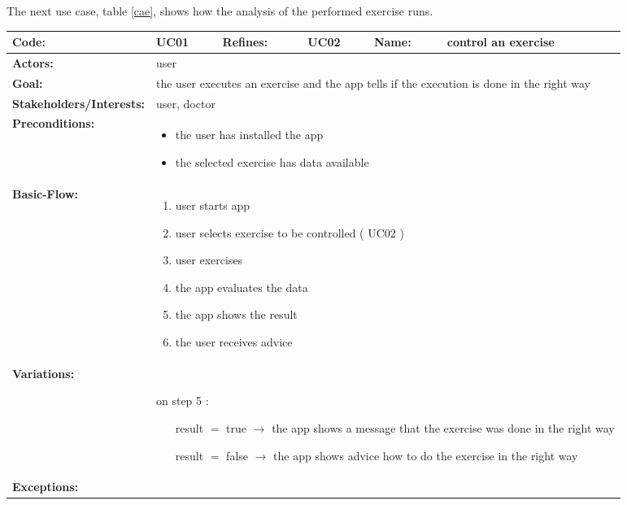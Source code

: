 \clearpage
The next use case, table \ref{cae}, shows how the analysis of the performed exercise runs.
\begin{table}[H]
	\begin{tabular}{|l|l|l|l|l|l|} \hline
		\textbf{Code:} & UC01 & \textbf{Refines:} & UC02 & \textbf{Name:} & control an exercise \\ \hline
		\textbf{Actors:} & \multicolumn{5}{l|}{user} \\ \hline
		\textbf{Goal:} & \multicolumn{5}{l|}{the user executes an exercise and the app tells if the execution is done in the right way} \\ \hline
		\textbf{Stakeholders/Interests:} & \multicolumn{5}{l|}{user, doctor} \\ \hline
		\textbf{Preconditions:} & \multicolumn{5}{l|}{\parbox{0.75\textwidth}{
			\begin{itemize}[itemsep=-5]
				\item the user has installed the app
				\item the selected exercise has data available
			\end{itemize}
		}} \\ \hline
		\textbf{Basic-Flow:} & \multicolumn{5}{l|}{\parbox{0.75\textwidth}{
			\begin{enumerate}[itemsep=-5]
				\item user starts app
				\item user selects exercise to be controlled ( UC02 )
				\item user exercises
				\item the app evaluates the data
				\item the app shows the result
				\item the user receives advice
			\end{enumerate}
		}} \\ \hline
		\textbf{Variations:} & \multicolumn{5}{l|}{\parbox{0.75\textwidth}{
			$ $\\on step 5 :
			\begin{itemize}[leftmargin=2.5cm,itemsep=-5]
				\item[result $=$ true ] $\rightarrow$ the app shows a message that the exercise was done in the right way 
				\item[result $=$ false] $\rightarrow$ the app shows advice how to do the exercise in the right way
			\end{itemize}
		}} \\ \hline
		\textbf{Exceptions:} & \multicolumn{5}{l|}{\parbox{0.75\textwidth}{
}}
\end{tabular}
\end{table}
